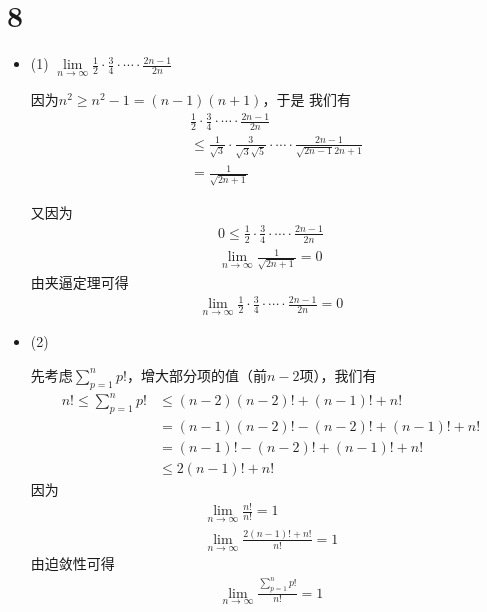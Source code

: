 \documentclass{article}
\begin{document}
\section*{8}

\begin{itemize}
  \item (1) $\lim\limits_{n \to \infty} \frac{1}{2} \cdot \frac{3}{4} \cdot \cdots \cdot \frac{2n - 1}{2n}$

        因为$n^2 \geq n^2 - 1 = (n - 1)(n + 1)$，于是
        我们有
        \begin{align*}
           & \frac{1}{2} \cdot \frac{3}{4} \cdot \cdots \cdot \frac{2n -1}{2n}                                              \\
           & \leq \frac{1}{\sqrt{3}} \cdot \frac{3}{\sqrt{3}\sqrt{5}} \cdot \cdots \cdot \frac{2n - 1}{\sqrt{2n - 1}{2n+1}} \\
           & = \frac{1}{\sqrt{2n + 1}}
        \end{align*}

        又因为
        \begin{align*}
          0 \leq \frac{1}{2} \cdot \frac{3}{4} \cdot \cdots \cdot \frac{2n - 1}{2n} \\
          \lim\limits_{n \to \infty} \frac{1}{\sqrt{2n + 1}} = 0
        \end{align*}
        由夹逼定理可得
        \begin{align*}
          \lim\limits_{n \to \infty} \frac{1}{2} \cdot \frac{3}{4} \cdot \cdots \cdot \frac{2n - 1}{2n} = 0
        \end{align*}

  \item (2)

        先考虑$\sum\limits_{p=1}^n p!$，增大部分项的值（前$n - 2$项），我们有
        \begin{align*}
          n ! \leq \sum\limits_{p=1}^n p! & \leq (n-2)(n-2)! + (n-1)! + n!         \\
                                          & = (n - 1)(n-2)! - (n-2)! + (n-1)! + n! \\
                                          & = (n-1)! - (n - 2)! + (n-1)! + n!      \\
                                          & \leq 2(n-1)! + n!
        \end{align*}
        因为
        \begin{align*}
          \lim\limits_{n \to \infty} \frac{n!}{n!} = 1 \\
          \lim\limits_{n \to \infty} \frac{2(n-1)! + n!}{n!} = 1
        \end{align*}
        由迫敛性可得
        \begin{align*}
          \lim\limits_{n \to \infty} \frac{\sum\limits_{p=1}^n p!}{n!} = 1
        \end{align*}


\end{itemize}
\end{document}

